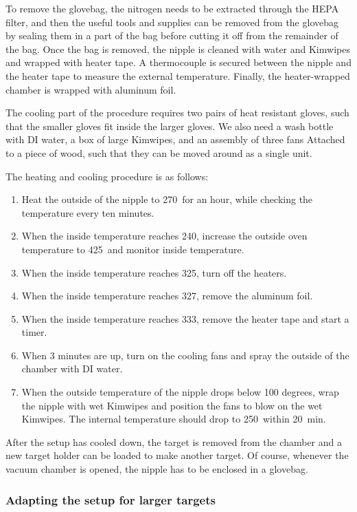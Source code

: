 To remove the glovebag, the nitrogen needs to be extracted through the HEPA
filter, and then the useful tools and supplies can be removed from the glovebag
by sealing them in a part of the bag before cutting it off from the remainder of
the bag. Once the bag is removed, the nipple is cleaned with water and Kimwipes
and wrapped with heater tape. A thermocouple is secured between the nipple and
the heater tape to measure the external temperature. Finally, the heater-wrapped
chamber is wrapped with aluminum foil.

The cooling part of the procedure requires two pairs of heat resistant gloves,
such that the smaller gloves fit inside the larger gloves. We also need a wash
bottle with DI water, a box of large Kimwipes, and an assembly of three fans
Attached to a piece of wood, such that they can be moved around as a single
unit.

The heating and cooling procedure is as follows:
%
\begin{enumerate}
   \item Heat the outside of the nipple to 270\degC\ for an hour, while checking
      the temperature every ten minutes.
   \item When the inside temperature reaches 240\degC, increase the outside oven
      temperature to 425\degC\ and monitor inside temperature.
   \item When the inside temperature reaches 325\degC, turn off the heaters.
   \item When the inside temperature reaches 327\degC, remove the aluminum foil.
   \item When the inside temperature reaches 333\degC, remove the heater tape
      and start a timer.
   \item When 3 minutes are up, turn on the cooling fans and spray the outside
      of the chamber with DI water.
   \item When the outside temperature of the nipple drops below 100 degrees,
      wrap the nipple with wet Kimwipes and position the fans to blow on the wet
      Kimwipes. The internal temperature should drop to 250\degC\ within 20~min.
\end{enumerate}

After the setup has cooled down, the target is removed from the chamber and a
new target holder can be loaded to make another target. Of course, whenever the
vacuum chamber is opened, the nipple has to be enclosed in a glovebag.

\subsubsection{Adapting the setup for larger targets}

